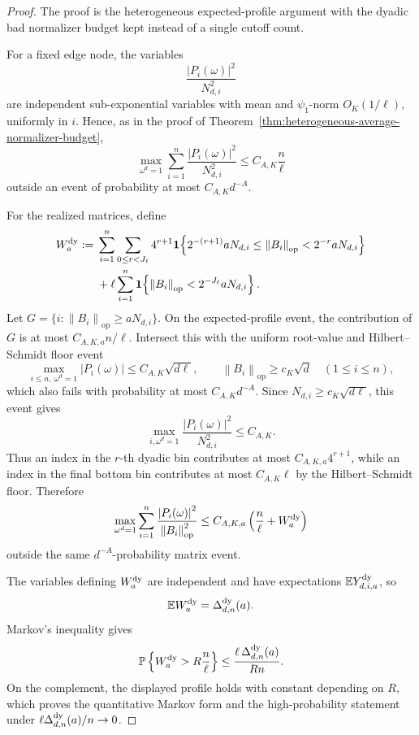 \documentclass[11pt]{amsart}
\numberwithin{equation}{section}
\theoremstyle{definition}
\theoremstyle{remark}
\newcommand{\op}{\mathrm{op}}
\newcommand{\Prob}{\mathbb P}
\newcommand{\Exp}{\mathbb E}
\newcommand{\norm}[1]{\left\lVert #1\right\rVert}
\newcommand{\abs}[1]{\left\lvert #1\right\rvert}
\begin{document}
\begin{proof}
The proof is the heterogeneous expected-profile argument with the dyadic bad
normalizer budget kept instead of a single cutoff count.

For a fixed edge node, the variables
\[
  \frac{\abs{P_i(\omega)}^2}{N_{d,i}^2}
\]
are independent sub-exponential variables with mean and \(\psi_1\)-norm
\(O_K(1/\ell)\), uniformly in \(i\).  Hence, as in the proof of
Theorem~\ref{thm:heterogeneous-average-normalizer-budget},
\[
  \max_{\omega^d=1}\sum_{i=1}^n
  \frac{\abs{P_i(\omega)}^2}{N_{d,i}^2}
  \le C_{A,K}\frac n\ell
\]
outside an event of probability at most \(C_{A,K}d^{-A}\).

For the realized matrices, define
\[
\begin{aligned}
  W_a^{\rm dy}:={}&
  \sum_{i=1}^n\sum_{0\le r<J_\ell}4^{r+1}
  \mathbf 1\!\left\{
  2^{-(r+1)}aN_{d,i}\le \norm{B_i}_{\op}
  <2^{-r}aN_{d,i}
  \right\} \\
  &+\ell\sum_{i=1}^n
  \mathbf 1\!\left\{
  \norm{B_i}_{\op}<2^{-J_\ell}aN_{d,i}
  \right\}.
\end{aligned}
\]
Let \(G=\{i:\norm{B_i}_{\op}\ge aN_{d,i}\}\).  On the expected-profile event,
the contribution of \(G\) is at most \(C_{A,K,a}n/\ell\).  Intersect this with
the uniform root-value and Hilbert--Schmidt floor event
\[
  \max_{i\le n,\ \omega^d=1}\abs{P_i(\omega)}
  \le C_{A,K}\sqrt{d\ell},
  \qquad
  \norm{B_i}_{\op}\ge c_K\sqrt d
  \quad(1\le i\le n),
\]
which also fails with probability at most \(C_{A,K}d^{-A}\).  Since
\(N_{d,i}\ge c_K\sqrt{d\ell}\), this event gives
\[
  \max_{i,\omega^d=1}\frac{\abs{P_i(\omega)}^2}{N_{d,i}^2}\le C_{A,K}.
\]
Thus an index in the \(r\)-th dyadic bin contributes at most
\(C_{A,K,a}4^{r+1}\), while an index in the final bottom bin contributes at
most \(C_{A,K}\ell\) by the Hilbert--Schmidt floor.  Therefore
\[
  \max_{\omega^d=1}
  \sum_{i=1}^n
  \frac{\abs{P_i(\omega)}^2}{\norm{B_i}_{\op}^2}
  \le C_{A,K,a}\left(\frac n\ell+W_a^{\rm dy}\right)
\]
outside the same \(d^{-A}\)-probability matrix event.

The variables defining \(W_a^{\rm dy}\) are independent and have expectations
\(\Exp Y_{d,i,a}^{\rm dy}\), so
\[
  \Exp W_a^{\rm dy}=\Delta_{d,n}^{\rm dy}(a).
\]
Markov's inequality gives
\[
  \Prob\left\{W_a^{\rm dy}>R\frac n\ell\right\}
  \le \frac{\ell\,\Delta_{d,n}^{\rm dy}(a)}{Rn}.
\]
On the complement, the displayed profile holds with constant depending on
\(R\), which proves the quantitative Markov form and the high-probability
statement under \(\ell\Delta_{d,n}^{\rm dy}(a)/n\to0\).


\end{proof}
\end{document}
